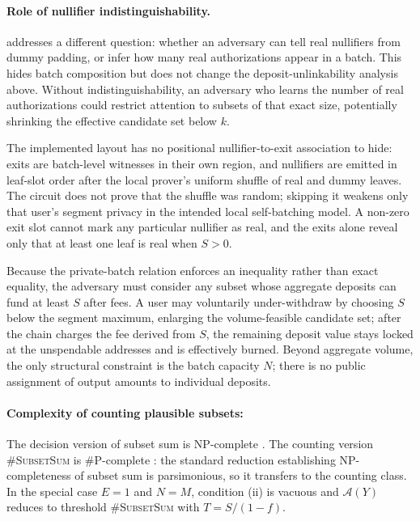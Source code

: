 \documentclass{iacrcc}
\begin{document}
\paragraph{Role of nullifier indistinguishability.}
 addresses a different question: whether an adversary can tell real nullifiers from dummy padding, or infer how many real authorizations appear in a batch. This hides batch composition but does not change the deposit-unlinkability analysis above. Without indistinguishability, an adversary who learns the number of real authorizations could restrict attention to subsets of that exact size, potentially shrinking the effective candidate set below \(k\).

The implemented layout has no positional nullifier-to-exit association to hide: exits are batch-level witnesses in their own region, and nullifiers are emitted in leaf-slot order after the local prover's uniform shuffle of real and dummy leaves. The circuit does not prove that the shuffle was random; skipping it weakens only that user's segment privacy in the intended local self-batching model. A non-zero exit slot cannot mark any particular nullifier as real, and the exits alone reveal only that at least one leaf is real when \(S > 0\).

Because the private-batch relation enforces an inequality rather than exact equality, the adversary must consider any subset whose aggregate deposits can fund at least \(S\) after fees. A user may voluntarily under-withdraw by choosing \(S\) below the segment maximum, enlarging the volume-feasible candidate set; after the chain charges the fee derived from \(S\), the remaining deposit value stays locked at the unspendable addresses and is effectively burned. Beyond aggregate volume, the only structural constraint is the batch capacity \(N\); there is no public assignment of output amounts to individual deposits.

\paragraph{Complexity of counting plausible subsets:}
The decision version of subset sum is NP-complete \cite{subsetsum}. The counting version \textsc{\#SubsetSum} is \#P-complete \cite{valiant1979}: the standard reduction establishing NP-completeness of subset sum is parsimonious, so it transfers to the counting class. In the special case \(E = 1\) and \(N = M\), condition (ii) is vacuous and \(\mathcal{A}(Y)\) reduces to threshold \textsc{\#SubsetSum} with \(T = S/(1-f)\).
\end{document}
